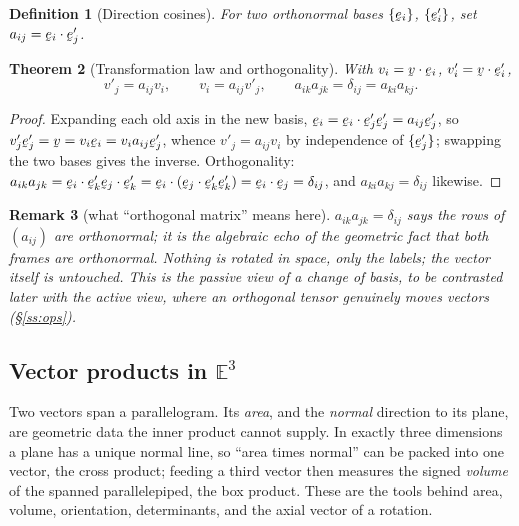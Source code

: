 \documentclass[17pt,a4paper]{extreport}
\DeclareRobustCommand{\vek}[1]{\underaccent{\tilde}{#1}}
\newcommand{\Et}{\mathbb{E}^{3}}
\newcommand{\bv}{\vek{v}}
\newcommand{\be}{\vek{e}}
\newcommand{\dd}{\delta}
\newcommand{\ip}[2]{#1\cdot#2}
\theoremstyle{scplain}
\newtheorem{theorem}{Theorem}[chapter]
\theoremstyle{scdefn}
\newtheorem{definition}[theorem]{Definition}
\newtheorem{remark}[theorem]{Remark}
\theoremstyle{scplain}
\begin{document}
\begin{definition}[Direction cosines]\label{def:dircos}
For two orthonormal bases $\{\be_{i}\}$, $\{\be'_{i}\}$, set
$a_{ij}=\ip{\be_{i}}{\be'_{j}}$.
\end{definition}

\begin{theorem}[Transformation law and orthogonality]\label{thm:cob}
With $v_{i}=\ip\bv{\be_{i}}$, $v'_{i}=\ip\bv{\be'_{i}}$,
\[
v'_{j}=a_{ij}v_{i},\qquad v_{i}=a_{ij}v'_{j},\qquad
a_{ik}a_{jk}=\dd_{ij}=a_{ki}a_{kj}.
\]
\end{theorem}

\begin{proof}
Expanding each old axis in the new basis,
$\be_{i}=\ip{\be_{i}}{\be'_{j}}\be'_{j}=a_{ij}\be'_{j}$, so
$v'_{j}\be'_{j}=\bv=v_{i}\be_{i}=v_{i}a_{ij}\be'_{j}$, whence
$v'_{j}=a_{ij}v_{i}$ by independence of $\{\be'_{j}\}$; swapping the two
bases gives the inverse. Orthogonality:
$a_{ik}a_{jk}=\ip{\be_{i}}{\be'_{k}}\ip{\be_{j}}{\be'_{k}}
=\ip{\be_{i}}{(\ip{\be_{j}}{\be'_{k}}\be'_{k})}=\ip{\be_{i}}{\be_{j}}
=\dd_{ij}$, and $a_{ki}a_{kj}=\dd_{ij}$ likewise.
\end{proof}

\begin{remark}[what ``orthogonal matrix'' means here]\label{rem:cobintuition}
$a_{ik}a_{jk}=\dd_{ij}$ says the rows of $(a_{ij})$ are orthonormal; it is
the algebraic echo of the geometric fact that both frames are orthonormal.
Nothing is rotated in space, only the labels; the vector itself is
untouched. This is the passive view of a change of basis, to be contrasted
later with the active view, where an orthogonal \emph{tensor} genuinely
moves vectors (\S\ref{ss:ops}).
\end{remark}

\subsection{Vector products in $\Et$}\label{ss:cross}

Two vectors span a parallelogram. Its \emph{area}, and the \emph{normal}
direction to its plane, are geometric data the inner product cannot supply.
In exactly three dimensions a plane has a unique normal line, so ``area
times normal'' can be packed into one vector, the cross product; feeding a
third vector then measures the signed \emph{volume} of the spanned
parallelepiped, the box product. These are the tools behind area, volume,
orientation, determinants, and the axial vector of a rotation.
\end{document}
